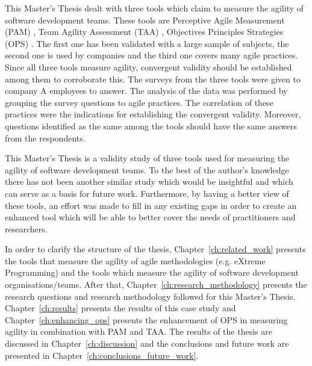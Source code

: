 This Master's Thesis dealt with three tools which claim to measure the agility of software development teams. These tools are Perceptive Agile Measurement (PAM) \cite{pam}, Team Agility Assessment (TAA) \cite{Leffingwell}, Objectives Principles Strategies (OPS) \cite{sventha_dissertation}. The first one has been validated with a large sample of subjects, the second one is used by companies and the third one covers many agile practices. Since all three tools measure agility, convergent validity should be established among them to corroborate this. The surveys from the three tools were given to company A employees to answer. The analysis of the data was performed by grouping the survey questions to agile practices. The correlation of these practices were the indications for establishing the convergent validity. Moreover, questions identified as the same among the tools should have the same answers from the respondents.

This Master's Thesis is a validity study of three tools used for measuring the agility of software development teams. To the best of the author's knowledge there has not been another similar study which would be insightful and which can serve as a basis for future work. Furthermore, by having a better view of these tools, an effort was made to fill in any existing gaps in order to create an enhanced tool which will be able to better cover the needs of practitioners and researchers. 

In order to clarify the structure of the thesis,  Chapter~\ref{ch:related_work} presents the tools that measure the agility of agile methodologies (e.g. eXtreme Programming) and the tools which measure the agility of software development organisations/teams. After that, Chapter~\ref{ch:research_methodology} presents the research questions and research methodology followed for this Master's Thesis. Chapter~\ref{ch:results} presents the results of this case study and Chapter~\ref{ch:enhancing_ops} presents the enhancement of \ac{OPS} in measuring agility in combination with \ac{PAM} and \ac{TAA}. The results of the thesis are discussed in Chapter~\ref{ch:discussion} and the conclusions and future work are presented in Chapter~\ref{ch:conclusions_future_work}.  